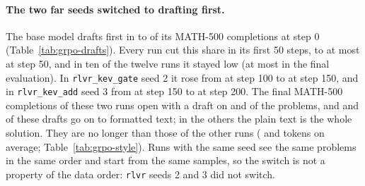 \paragraph{The two far seeds switched to drafting first.} The base model drafts first in  to
 of its MATH-500 completions at step 0 (Table~\ref{tab:grpo-drafts}). Every run cut this share in
its first 50 steps, to at most  at step 50, and in ten of the twelve runs it stayed low (at most
 in the final evaluation). In \texttt{rlvr\_kev\_gate} seed 2 it rose from  at
step 100 to  at step 150, and in \texttt{rlvr\_kev\_add} seed 3 from
 at step 150 to  at step 200. The final MATH-500 completions of
these two runs open with a draft on  and  of the problems, and
 and  of these drafts go on to formatted text; in the others the
plain text is the whole solution. They are no longer than those of the other runs ( and  tokens on average;
Table~\ref{tab:grpo-style}). Runs with the same seed see the same problems in the same order and start from the same
samples, so the switch is not a property of the data order: \texttt{rlvr} seeds 2 and 3 did not switch.

\begin{table}[t]
\centering\small

\caption{The share of MATH-500 completions that open with an informal draft (no math delimiter, markdown heading or
bold in the first 300 characters), at each periodic evaluation (greedy, every 50 steps) and in the final evaluation,
per run, with the final accuracies.}
\label{tab:grpo-drafts}
\end{table}

